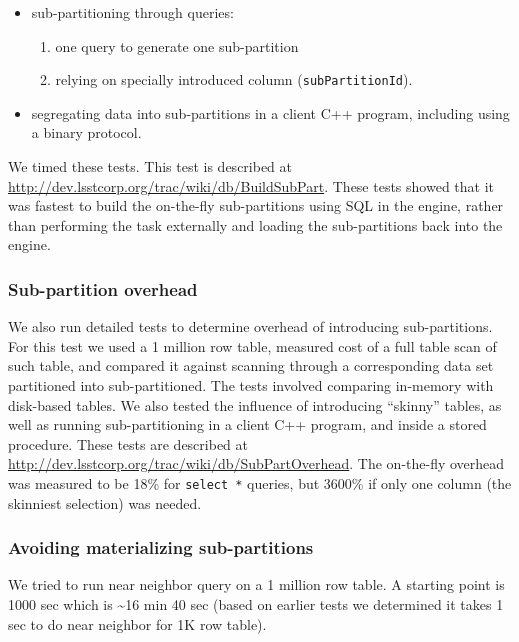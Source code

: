 \documentclass[DM,lsstdraft,toc]{lsstdoc}
\begin{document}
\begin{itemize}
\item
  sub-partitioning through queries:

  \begin{enumerate}
  \def\labelenumi{\arabic{enumi}.}
  \item
    one query to generate one sub-partition
  \item
    relying on specially introduced column (\texttt{subPartitionId}).
  \end{enumerate}
\item
  segregating data into sub-partitions in a client C++ program,
  including using a binary protocol.
\end{itemize}

We timed these tests. This test is described at
\url{http://dev.lsstcorp.org/trac/wiki/db/BuildSubPart}. These tests
showed that it was fastest to build the on-the-fly sub-partitions using
SQL in the engine, rather than performing the task externally and
loading the sub-partitions back into the engine.

\subsubsection{Sub-partition overhead}\label{sub-partition-overhead}

We also run detailed tests to determine overhead of introducing
sub-partitions. For this test we used a 1 million row table, measured
cost of a full table scan of such table, and compared it against
scanning through a corresponding data set partitioned into
sub-partitioned. The tests involved comparing in-memory with disk-based
tables. We also tested the influence of introducing ``skinny'' tables,
as well as running sub-partitioning in a client C++ program, and inside
a stored procedure. These tests are described at
\url{http://dev.lsstcorp.org/trac/wiki/db/SubPartOverhead}. The
on-the-fly overhead was measured to be 18\% for \texttt{select\ *}
queries, but 3600\% if only one column (the skinniest selection) was
needed.

\subsubsection{Avoiding materializing
sub-partitions}\label{avoiding-materializing-sub-partitions}

We tried to run near neighbor query on a 1 million row table. A starting
point is 1000 sec which is \textasciitilde{}16 min 40 sec (based on
earlier tests we determined it takes 1 sec to do near neighbor for 1K
row table).
\end{document}
